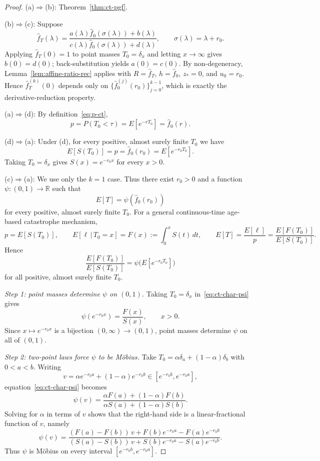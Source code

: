 \documentclass[10pt,a4paper]{amsart}
\begin{document}
\begin{proof}
(a)$\Rightarrow$(b): Theorem~\ref{thm:ct-pgf}.

(b)$\Rightarrow$(c): Suppose
\[
  \hat f_T(\lambda)=\frac{a(\lambda)\hat f_0(\sigma(\lambda))+b(\lambda)}
  {c(\lambda)\hat f_0(\sigma(\lambda))+d(\lambda)},
  \qquad \sigma(\lambda)=\lambda+r_0.
\]
Applying $\hat f_T(0)=1$ to point masses $T_0=\delta_x$ and letting $x\to\infty$ gives $b(0)=d(0)$; back-substitution yields $a(0)=c(0)$. By non-degeneracy, Lemma~\ref{lem:affine-ratio-rec} applies with $R=\hat f_T$, $h=\hat f_0$, $z_*=0$, and $u_0=r_0$. Hence $\hat f_T^{(k)}(0)$ depends only on $\{\hat f_0^{(j)}(r_0)\}_{j=0}^{k-1}$, which is exactly the derivative-reduction property.

(a)$\Rightarrow$(d): By definition~\eqref{eq:p-ct},
\[
  p=P(T_0<\tau)=E[e^{-rT_0}]=\hat f_0(r).
\]

(d)$\Rightarrow$(a): Under (d), for every positive, almost surely finite
$T_0$ we have
\[
  E[S(T_0)] = p = \hat f_0(r_0)=E[e^{-r_0 T_0}].
\]
Taking $T_0=\delta_x$ gives $S(x)=e^{-r_0 x}$ for every $x>0$.

(c)$\Rightarrow$(a): We use only the $k=1$ case.  Thus there exist
$r_0>0$ and a function $\psi:(0,1)\to\mathbb R$ such that
\[
  E[T]=\psi(\hat f_0(r_0))
\]
for every positive, almost surely finite $T_0$.
For a general continuous-time age-based catastrophe mechanism,
\[
  p=E[S(T_0)],\qquad
  E[\ell\,|\,T_0=x]=F(x):=\int_0^x S(t)\,dt,
\qquad
  E[T]=\frac{E[\ell]}{p}
      =\frac{E[F(T_0)]}{E[S(T_0)]}.
\]
Hence
\begin{equation}\label{eq:ct-char-psi}
  \frac{E[F(T_0)]}{E[S(T_0)]}
  =\psi\!\bigl(E[e^{-r_0 T_0}]\bigr)
\end{equation}
for all positive, almost surely finite $T_0$.

\emph{Step 1: point masses determine $\psi$ on $(0,1)$.}
Taking $T_0=\delta_x$ in~\eqref{eq:ct-char-psi} gives
\[
  \psi(e^{-r_0 x})=\frac{F(x)}{S(x)}, \qquad x>0.
\]
Since $x\mapsto e^{-r_0 x}$ is a bijection $(0,\infty)\to(0,1)$, point
masses determine $\psi$ on all of $(0,1)$.

\emph{Step 2: two-point laws force $\psi$ to be M\"obius.}
Take $T_0=\alpha\delta_a+(1-\alpha)\delta_b$ with $0<a<b$.  Writing
\[
  v=\alpha e^{-r_0 a}+(1-\alpha)e^{-r_0 b}\in[e^{-r_0 b},e^{-r_0 a}],
\]
equation~\eqref{eq:ct-char-psi} becomes
\[
  \psi(v)
  =
  \frac{\alpha F(a)+(1-\alpha)F(b)}
       {\alpha S(a)+(1-\alpha)S(b)}.
\]
Solving for $\alpha$ in terms of $v$ shows that the right-hand side is a
linear-fractional function of $v$, namely
\[
  \psi(v)
  =
  \frac{(F(a)-F(b))\,v + F(b)e^{-r_0 a}-F(a)e^{-r_0 b}}
       {(S(a)-S(b))\,v + S(b)e^{-r_0 a}-S(a)e^{-r_0 b}}.
\]
Thus $\psi$ is M\"obius on every interval
$[e^{-r_0 b},e^{-r_0 a}]$.


\end{proof}
\end{document}
